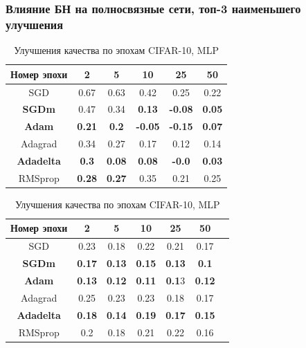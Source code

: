 \documentclass{beamer}
\begin{document}
\begin{frame}
	\frametitle{\small Влияние БН на полносвязные сети, топ-3 наименьшего улучшения}
\begin{table}[h!]
\centering
\begin{minipage}{1\linewidth}
\centering
\scriptsize
\begin{tabular}{|c|c|c|c|c|c|}\hline
\textbf{Номер эпохи} & \textbf{2} & \textbf{5} & \textbf{10} & \textbf{25} & \textbf{50} \\\hline
SGD & 0.67 & 0.63 & 0.42 & 0.25 & 0.22 \\\hline

\textbf{SGDm} & 0.47 & 0.34 &  \textbf{0.13} &  \color{red}\textbf{-0.08} &  \textbf{0.05} \\\hline

\textbf{Adam} &  \textbf{0.21} &  \textbf{0.2} & \color{red}\textbf{-0.05} & \color{red}\textbf{-0.15} & \textbf{0.07} \\\hline

Adagrad & 0.34 & 0.27 & 0.17 & 0.12 & 0.14 \\\hline

\textbf{Adadelta} & \textbf{0.3} & \textbf{0.08} & \textbf{0.08} & \color{red}\textbf{-0.0} & \textbf{0.03} \\\hline

RMSprop & \textbf{0.28} & \textbf{0.27} & 0.35 & 0.21 & 0.25 \\\hline

\end{tabular}
\caption{\scriptsize Улучшения качества по эпохам MNIST, MLP}
\end{minipage} \vfill
\begin{minipage}{1\linewidth}
\centering
\scriptsize
\begin{tabular}{|c|c|c|c|c|c|c|}\hline
\textbf{Номер эпохи} & \textbf{2} & \textbf{5} & \textbf{10} & \textbf{25} & \textbf{50} \\\hline

SGD & 0.23 & 0.18 & 0.22 & 0.21 & 0.17 \\\hline

\textbf{SGDm} & \textbf{0.17} & \textbf{0.13} & \textbf{0.15} & \textbf{0.13} & \textbf{0.1} \\\hline

\textbf{Adam} & \textbf{0.13} &\textbf{ 0.12} & \textbf{0.11} & \textbf{0.1}3 & \textbf{0.12} \\\hline

Adagrad & 0.25 & 0.23 & 0.23 & 0.18 & 0.17 \\\hline

\textbf{Adadelta} & \textbf{0.18} & \textbf{0.14} & \textbf{0.19} & \textbf{0.17} & \textbf{0.15} \\\hline

RMSprop & 0.2 & 0.18 & 0.21 & 0.22 & 0.16 \\\hline

\end{tabular}
\caption{\scriptsize Улучшения качества по эпохам CIFAR-10, MLP}
\end{minipage}

\end{table}
\end{frame}
\end{document}
